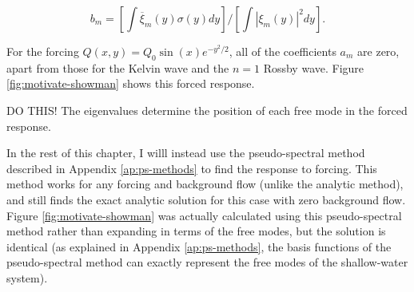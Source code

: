 \begin{equation}
  b _ { m } = \left[ \int \overline { \xi } _ { m } ( y ) \sigma ( y ) d y \right] / \left[ \int \left| \xi _ { m } ( y ) \right| ^ { 2 } d y \right].
\end{equation}

For the forcing $Q(x,y) = Q_{0} \sin(x) e^{-y^{2}/2}$, all of the coefficients $a_{m}$ are zero, apart from those for the Kelvin wave and the $n=1$ Rossby wave. Figure \ref{fig:motivate-showman} shows this forced response.

DO THIS! The eigenvalues determine the position of each free mode in the forced response.

In the rest of this chapter, I willl instead use the pseudo-spectral method described in Appendix \ref{ap:ps-methods} to find the response to forcing. This method works for any forcing and background flow (unlike the analytic method), and still finds the exact analytic solution for this case with zero background flow. Figure \ref{fig:motivate-showman} was actually calculated using this pseudo-spectral method rather than expanding in terms of the free modes, but the solution is identical (as explained in Appendix \ref{ap:ps-methods}, the basis functions of the pseudo-spectral method can exactly represent the free modes of the shallow-water system).

